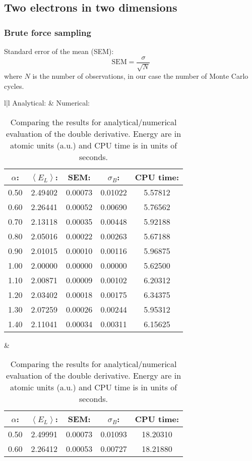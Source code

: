 \subsection{Two electrons in two dimensions}

\subsubsection{Brute force sampling}

Standard error of the mean (SEM):
\begin{equation}
\text{SEM} = \frac{\sigma}{\sqrt{N}}
\end{equation}
where $N$ is the number of observations, in our case the number of Monte Carlo cycles.

\begin{table}[H]\caption{Comparing the results for analytical/numerical evaluation of the double derivative. Energy are in atomic units (a.u.) and CPU time is in units of seconds.}\label{tab:brute_force_no_interaction_2p}
\center
\begin{tabular}{l|l}
Analytical: &  Numerical:\\ \hline
\begin{tabular}{ccccc}
$\alpha$: & $\left< E_L \right>$: & SEM: & $\sigma_B$: & CPU time:\\ \hline
0.50 & 2.49402 & 0.00073 & 0.01022 & 5.57812\\
0.60 & 2.26441 & 0.00052 & 0.00690 & 5.76562\\
0.70 & 2.13118 & 0.00035 & 0.00448 & 5.92188\\
0.80 & 2.05016 & 0.00022 & 0.00263 & 5.67188\\
0.90 & 2.01015 & 0.00010 & 0.00116 & 5.96875\\
1.00 & 2.00000 & 0.00000 & 0.00000 & 5.62500\\
1.10 & 2.00871 & 0.00009 & 0.00102 & 6.20312\\
1.20 & 2.03402 & 0.00018 & 0.00175 & 6.34375\\
1.30 & 2.07259 & 0.00026 & 0.00244 & 5.95312\\
1.40 & 2.11041 & 0.00034 & 0.00311 & 6.15625\\ \hline
\end{tabular} & \begin{tabular}{ccccc}
$\alpha$: & $\left< E_L \right>$: & SEM: & $\sigma_B$: & CPU time:\\ \hline
0.50 & 2.49991 & 0.00073 & 0.01093 & 18.20310\\
0.60 & 2.26412 & 0.00053 & 0.00727 & 18.21880\\

\end{tabular}
\end{tabular}
\end{table}
